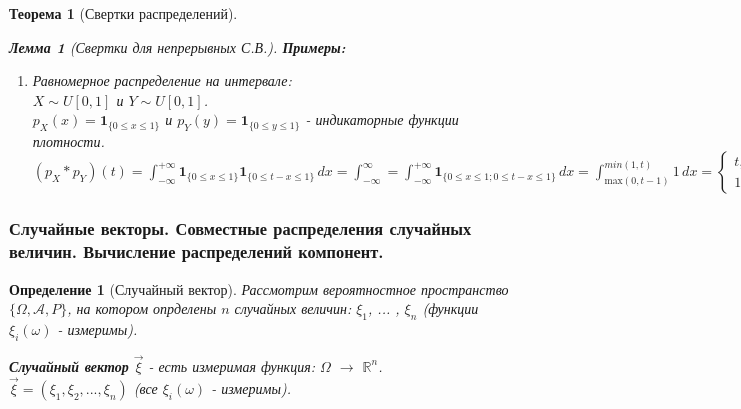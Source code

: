 \documentclass[14pt]{extarticle}
\theoremstyle{breakstyle}
\newtheorem{definition}{Определение}[subsection]
\newtheorem{theorem}{Теорема}[subsection]
\newtheorem{lemma}{Лемма}[subsection]
\begin{document}
\begin{theorem}[Свертки распределений]
\begin{lemma}[Свертки для непрерывных С.В.]
\vspace{\baselineskip}

\textbf{Примеры:}
\begin{enumerate}
    \item Равномерное распределение на интервале: \\
          $X \sim U[0, 1]$ и $Y \sim U[0, 1]$.\\
          $p_{X}(x) = \mathbf{1}_{\{0 \leq x \leq 1\}}$ и $p_{Y}(y) = \mathbf{1}_{\{0 \leq y \leq 1\}}$ - индикаторные функции плотности.\\
          $(p_{X} * p_{Y})(t) = \int_{-\infty}^{+\infty} \mathbf{1}_{\{0 \leq x \leq 1\}} \mathbf{1}_{\{0 \leq t - x \leq 1\}} \, dx = \int_{-\infty}^{\infty} = \int_{-\infty}^{+\infty}\mathbf{1}_{\{0 \leq x \leq 1; 0 \leq t - x \leq 1\}} \, dx = \int_{\text{max}(0, t-1)}^{min(1, t)} 1 \, dx = \begin{cases} 
          t, & t \in [0, 1] \\
          1 - (t - 1), & t \in [1, 2]
          \end{cases}$ 
\end{enumerate}

\end{lemma}

\end{theorem}

\subsubsection{Случайные векторы. Совместные распределения случайных величин. Вычисление распределений компонент.}
\begin{definition}[Случайный вектор]

Рассмотрим вероятностное пространство $\{\Omega, \mathscr{A}, P\}$, на котором опрделены $n$ случайных величин: $\xi_{1}$, ... , $\xi_{n}$ (функции $\xi_{i}(\omega)$ - измеримы).

\vspace{\baselineskip}

\textbf{Случайный вектор} $\vec{\xi}$ - есть измеримая функция: $\Omega$ $\rightarrow$ $\mathbb{R}^{n}$. \\
$\vec{\xi} = (\xi_{1}, \xi_{2}, ... , \xi_{n})$ (все $\xi_{i}(\omega)$ - измеримы).

\end{definition}
\end{document}
